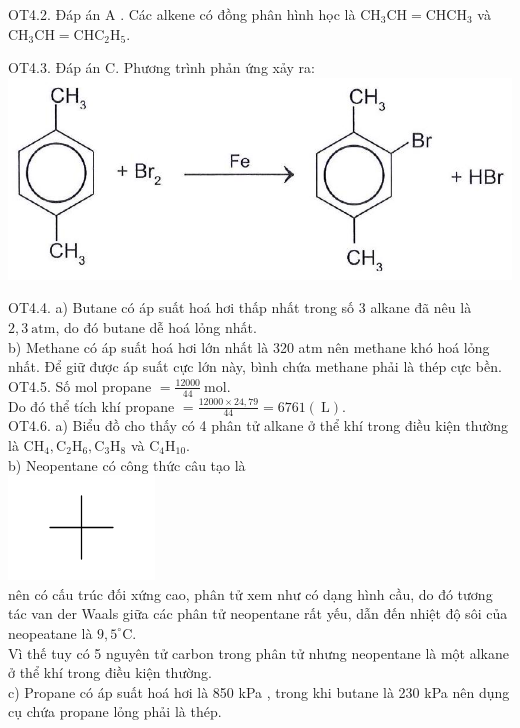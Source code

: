 \documentclass[10pt]{article}
\begin{document}
OT4.2. Đáp án A . Các alkene có đồng phân hình học là $\mathrm{CH}_{3} \mathrm{CH}=\mathrm{CHCH}_{3}$ và $\mathrm{CH}_{3} \mathrm{CH}=\mathrm{CHC}_{2} \mathrm{H}_{5}$.

OT4.3. Đáp án C. Phương trình phản ứng xảy ra:\\
\includegraphics[max width=\textwidth, center]{2025_10_23_adad5b98d65ac6665838g-28(2)}

OT4.4. a) Butane có áp suất hoá hơi thấp nhất trong số 3 alkane đã nêu là $2,3 \mathrm{~atm}$, do đó butane dễ hoá lỏng nhất.\\
b) Methane có áp suất hoá hơi lớn nhất là 320 atm nên methane khó hoá lỏng nhất. Để giữ được áp suất cực lớn này, bình chứa methane phải là thép cực bền.\\
OT4.5. Số mol propane $=\frac{12000}{44} \mathrm{~mol}$.\\
Do đó thể tích khí propane $=\frac{12000 \times 24,79}{44}=6761(\mathrm{~L})$.\\
OT4.6. a) Biểu đồ cho thấy có 4 phân tử alkane ở thể khí trong điều kiện thường là $\mathrm{CH}_{4}, \mathrm{C}_{2} \mathrm{H}_{6}, \mathrm{C}_{3} \mathrm{H}_{8}$ và $\mathrm{C}_{4} \mathrm{H}_{10}$.\\
b) Neopentane có công thức câu tạo là\\
\includegraphics{smile-3bd9d41396a616d3659ed529031971e7de8b34ff}\\
nên có cấu trúc đối xứng cao, phân tử xem như có dạng hình cầu, do đó tương tác van der Waals giữa các phân tử neopentane rất yếu, dẫn đến nhiệt độ sôi của neopeatane là $9,5^{\circ} \mathrm{C}$.\\
Vì thế tuy có 5 nguyên tử carbon trong phân tử nhưng neopentane là một alkane ở thể khí trong điều kiện thường.\\
c) Propane có áp suất hoá hơi là 850 kPa , trong khi butane là 230 kPa nên dụng cụ chứa propane lỏng phải là thép.
\end{document}
